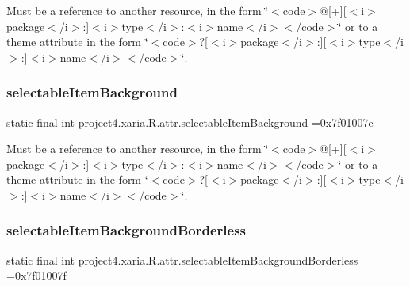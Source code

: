 Must be a reference to another resource, in the form \char`\"{}$<$code$>$@\mbox{[}+\mbox{]}\mbox{[}$<$i$>$package$<$/i$>$\+:\mbox{]}$<$i$>$type$<$/i$>$\+:$<$i$>$name$<$/i$>$$<$/code$>$\char`\"{} or to a theme attribute in the form \char`\"{}$<$code$>$?\mbox{[}$<$i$>$package$<$/i$>$\+:\mbox{]}\mbox{[}$<$i$>$type$<$/i$>$\+:\mbox{]}$<$i$>$name$<$/i$>$$<$/code$>$\char`\"{}. \mbox{\label{classproject4_1_1xaria_1_1R_1_1attr_a2e776b1c49ec1662136744a824e24a19}} 
\subsubsection{\texorpdfstring{selectable\+Item\+Background}{selectableItemBackground}}
{\footnotesize\ttfamily static final int project4.\+xaria.\+R.\+attr.\+selectable\+Item\+Background =0x7f01007e\hspace{0.3cm}{\ttfamily [static]}}

Must be a reference to another resource, in the form \char`\"{}$<$code$>$@\mbox{[}+\mbox{]}\mbox{[}$<$i$>$package$<$/i$>$\+:\mbox{]}$<$i$>$type$<$/i$>$\+:$<$i$>$name$<$/i$>$$<$/code$>$\char`\"{} or to a theme attribute in the form \char`\"{}$<$code$>$?\mbox{[}$<$i$>$package$<$/i$>$\+:\mbox{]}\mbox{[}$<$i$>$type$<$/i$>$\+:\mbox{]}$<$i$>$name$<$/i$>$$<$/code$>$\char`\"{}. \mbox{\label{classproject4_1_1xaria_1_1R_1_1attr_af949c147fbea947b5f1ead8ce1e2be78}} 
\subsubsection{\texorpdfstring{selectable\+Item\+Background\+Borderless}{selectableItemBackgroundBorderless}}
{\footnotesize\ttfamily static final int project4.\+xaria.\+R.\+attr.\+selectable\+Item\+Background\+Borderless =0x7f01007f\hspace{0.3cm}{\ttfamily [static]}}

